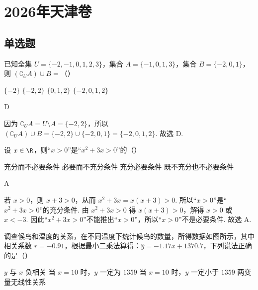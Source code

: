 \chapter{2026年天津卷}

\section{单选题}

\begin{problem}
已知全集 \(U=\{-2,-1,0,1,2,3\}\)，集合 \(A=\{-1,0,1,3\}\)，集合 \(B=\{-2,0,1\}\)，则 \(\left( \complement_U A \right)\cup B=\)（\quad）

\choices
    {\(\{-2\}\)}
    {\(\{-2,2\}\)}
    {\(\{0,1,2\}\)}
    {\(\{-2,0,1,2\}\)}
\end{problem}

\begin{answer}
D
\end{answer}

\begin{solution}
因为 \(\complement_U A=U\setminus A=\{-2,2\}\)，所以 \(\left( \complement_U A \right)\cup B=\{-2,2\}\cup\{-2,0,1\}=\{-2,0,1,2\}\). 故选 D.
\end{solution}

\begin{problem}
设 \(x\in \R\)，则“\(x>0\)”是“\(x^2+3x>0\)”的（\quad）

\choices
    {充分而不必要条件}
    {必要而不充分条件}
    {充分必要条件}
    {既不充分也不必要条件}
\end{problem}

\begin{answer}
A
\end{answer}

\begin{solution}
若 \(x>0\)，则 \(x+3>0\)，从而 \(x^2+3x=x\left( x+3 \right)>0\). 所以“\(x>0\)”是“\(x^2+3x>0\)”的充分条件. 由 \(x^2+3x>0\) 得 \(x\left( x+3 \right)>0\)，解得 \(x>0\) 或 \(x<-3\). 因此“\(x^2+3x>0\)”不能推出“\(x>0\)”，所以“\(x>0\)”不是必要条件. 故选 A.
\end{solution}

\begin{problem}
调查候鸟和温度的关系，在不同温度下统计候鸟的数量，所得数据如图所示，其中相关系数 \(r=-0.91\)，根据最小二乘法算得：\(\hat{y}=-1.17x+1370.7\)，下列说法正确的是（\quad）


\choices
    {\(y\) 与 \(x\) 负相关}
    {当 \(x=10\) 时，\(y\) 一定为 \(1359\)}
    {当 \(x=10\) 时，\(y\) 一定小于 \(1359\)}
    {两变量无线性关系}
\end{problem}

